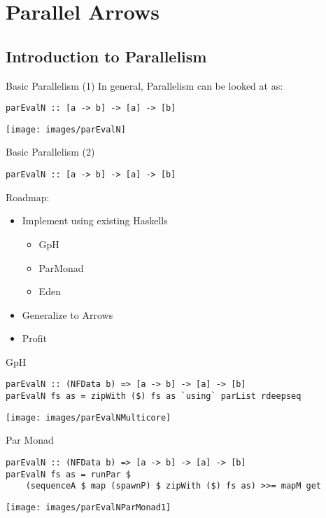 \section{Parallel Arrows}
\subsection{Introduction to Parallelism}
\begin{frame}[fragile]{Basic Parallelism (1)}
In general, Parallelism can be looked at as:
\begin{lstlisting}[frame=htrbl]
parEvalN :: [a -> b] -> [a] -> [b]
\end{lstlisting}
\begin{center}
\texttt{[image: images/parEvalN]}
\end{center}
\end{frame}
\begin{frame}[fragile]{Basic Parallelism (2)}
\begin{lstlisting}[frame=htrbl]
parEvalN :: [a -> b] -> [a] -> [b]
\end{lstlisting}
Roadmap:
\begin{itemize}
\item Implement using existing Haskells
\begin{itemize}
\item GpH
\item ParMonad
\item Eden
\end{itemize}
\item Generalize to Arrows
\item Profit
\end{itemize}
\end{frame}

\begin{frame}[fragile]{GpH}
\begin{lstlisting}[frame=htrbl]
parEvalN :: (NFData b) => [a -> b] -> [a] -> [b]
parEvalN fs as = zipWith ($) fs as `using` parList rdeepseq
\end{lstlisting}
\begin{center}
	\texttt{[image: images/parEvalNMulticore]}
\end{center}
\end{frame}

\begin{frame}[fragile]{Par Monad}
\begin{lstlisting}[frame=htrbl]
parEvalN :: (NFData b) => [a -> b] -> [a] -> [b]
parEvalN fs as = runPar $ 
	(sequenceA $ map (spawnP) $ zipWith ($) fs as) >>= mapM get
\end{lstlisting}
\begin{center}
\texttt{[image: images/parEvalNParMonad1]}
\end{center}
\end{frame}

